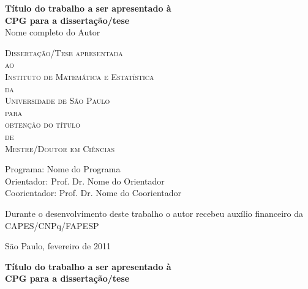 \documentclass[11pt,twoside,a4paper]{book}
\theoremstyle{note}
\begin{document}
\frontmatter 
\fancyhead[RO]{{\footnotesize\rightmark}\hspace{2em}\thepage}
\setcounter{tocdepth}{2}
\fancyhead[LE]{\thepage\hspace{2em}\footnotesize{\leftmark}}
\fancyhead[RE,LO]{}
\fancyhead[RO]{{\footnotesize\rightmark}\hspace{2em}\thepage}

\onehalfspacing  %

\thispagestyle{empty}
\begin{center}
    \vspace*{2.3cm}
    \textbf{\Large{Título do trabalho a ser apresentado à \\
    CPG para a dissertação/tese}}\\
    
    \vspace*{1.2cm}
    \Large{Nome completo do Autor}
    
    \vskip 2cm
    \textsc{
    Dissertação/Tese apresentada\\[-0.25cm] 
    ao\\[-0.25cm]
    Instituto de Matemática e Estatística\\[-0.25cm]
    da\\[-0.25cm]
    Universidade de São Paulo\\[-0.25cm]
    para\\[-0.25cm]
    obtenção do título\\[-0.25cm]
    de\\[-0.25cm]
    Mestre/Doutor em Ciências}
    
    \vskip 1.5cm
    Programa: Nome do Programa\\
    Orientador: Prof. Dr. Nome do Orientador\\
    Coorientador: Prof. Dr. Nome do Coorientador

   	\vskip 1cm
    \normalsize{Durante o desenvolvimento deste trabalho o autor recebeu auxílio
    financeiro da CAPES/CNPq/FAPESP}
    
    \vskip 0.5cm
    \normalsize{São Paulo, fevereiro de 2011}
\end{center}

%
%
%
\newpage
\thispagestyle{empty}
    \begin{center}
        \vspace*{2.3 cm}
        \textbf{\Large{Título do trabalho a ser apresentado à \\
        CPG para a dissertação/tese}}\\
        \vspace*{2 cm}
    \end{center}
\end{document}
